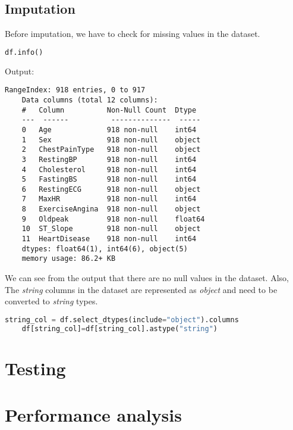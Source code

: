 \subsection{Imputation}
Before imputation, we have to check for missing values in the dataset.
\begin{lstlisting}[language=Python, caption=Dataset information]
	df.info()\end{lstlisting}
Output:
\begin{lstlisting}[numbers=none]
	RangeIndex: 918 entries, 0 to 917
	Data columns (total 12 columns):
	#   Column          Non-Null Count  Dtype  
	---  ------          --------------  -----  
	0   Age             918 non-null    int64  
	1   Sex             918 non-null    object 
	2   ChestPainType   918 non-null    object 
	3   RestingBP       918 non-null    int64  
	4   Cholesterol     918 non-null    int64  
	5   FastingBS       918 non-null    int64  
	6   RestingECG      918 non-null    object 
	7   MaxHR           918 non-null    int64  
	8   ExerciseAngina  918 non-null    object 
	9   Oldpeak         918 non-null    float64
	10  ST_Slope        918 non-null    object 
	11  HeartDisease    918 non-null    int64  
	dtypes: float64(1), int64(6), object(5)
	memory usage: 86.2+ KB
\end{lstlisting}


We can see from the output that there are no null values in the dataset. Also, The \textit{string} columns in the dataset are represented as \textit{object} and need to be converted to \textit{string} types.


\begin{lstlisting}[language=Python, caption={Convert object columns to string}]
	string_col = df.select_dtypes(include="object").columns
	df[string_col]=df[string_col].astype("string")
\end{lstlisting}



\section{Testing}

\section{Performance analysis}